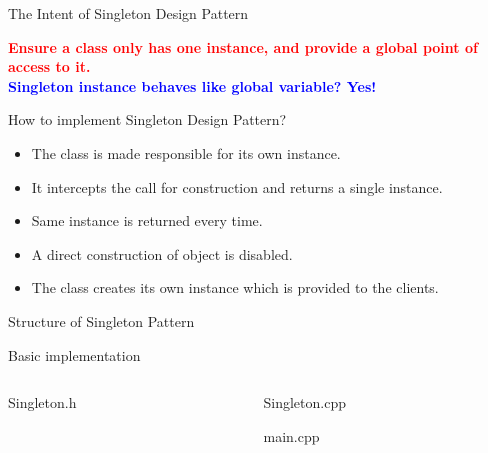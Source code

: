 \documentclass[13pt]{beamer}
\begin{document}
\begin{frame}{The Intent of Singleton Design Pattern}
	\begin{center}
	\textcolor{red}{\textbf{Ensure a class only has one instance, and provide a global point of access to it.}}\\
	\textcolor{blue}{\textbf{Singleton instance behaves like global variable? Yes!}}
	\end{center}
\end{frame}

\begin{frame}{How to implement Singleton Design Pattern?}
	\begin{itemize}
		\setlength\itemsep{2em}
		\item The class is made responsible for its own instance.
		\item It intercepts the call for construction and returns a single instance.
		\item Same instance is returned every time.
		\item A direct construction of object is disabled.
		\item The class creates its own instance which is provided to the clients.
	\end{itemize}
\end{frame}

\begin{frame}{Structure of Singleton Pattern}
	\begin{center}
	\end{center}
\end{frame}

\begin{frame}{Basic implementation}
\begin{columns}[T]
\begin{column}{.45\textwidth}
\lstset{basicstyle=\tiny,style=myCustomCppStyle}
Singleton.h

\end{column}

\begin{column}{.45\textwidth}
\lstset{basicstyle=\tiny,style=myCustomCppStyle}
Singleton.cpp

main.cpp

\end{column}
\end{columns}
\end{frame}
\end{document}
